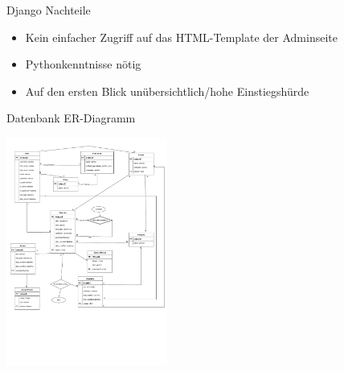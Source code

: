 \documentclass[english,hangout]{beamer}
\begin{document}
\begin{frame}{Django Nachteile}
\begin{itemize}
 \item Kein einfacher Zugriff auf das HTML-Template der Adminseite
 \item Pythonkenntnisse nötig
 \item Auf den ersten Blick unübersichtlich/hohe Einstiegshürde
\end{itemize}
\end{frame}

\begin{frame}{Datenbank ER-Diagramm}
 \begin{center}
\includegraphics[height=7.5cm]{dynexgen-erd.pdf}
\end{center}
\vspace{-6mm}
\end{frame}
\end{document}
